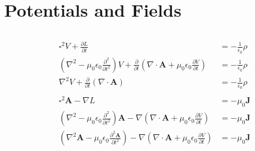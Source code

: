 \documentclass{article}
\renewcommand{\vec}[1]{\boldsymbol{\mathbf{#1}}}
\begin{document}
\section{Potentials and Fields}

\subsection{}

\begin{align*}
  \square^2 V + \frac{\partial L}{\partial t}                                                                                                                                                     & = -\frac{1}{\epsilon_0} \rho \\
  \left( \nabla^2 - \mu_0 \epsilon_0 \frac{\partial^2}{\partial t^2} \right) V + \frac{\partial}{\partial t} \left( \nabla \cdot \vec{A} + \mu_0 \epsilon_0 \frac{\partial V}{\partial t} \right) & = -\frac{1}{\epsilon_0} \rho \\
  \nabla^2 V + \frac{\partial}{\partial t} (\nabla \cdot \vec{A})                                                                                                                                 & = -\frac{1}{\epsilon_0} \rho \\ \\
  \square^2 \vec{A} - \nabla L                                                                                                                                                                    & = -\mu_0 \vec{J}             \\
  \left( \nabla^2 - \mu_0 \epsilon_0 \frac{\partial^2}{\partial t^2} \right) \vec{A} - \nabla \left( \nabla \cdot \vec{A} + \mu_0 \epsilon_0 \frac{\partial V}{\partial t} \right)                & = -\mu_0 \vec{J}             \\
  \left( \nabla^2 \vec{A} - \mu_0 \epsilon_0 \frac{\partial^2 \vec{A}}{\partial t^2} \right) - \nabla \left( \nabla \cdot \vec{A} + \mu_0 \epsilon_0 \frac{\partial V}{\partial t} \right)        & = -\mu_0 \vec{J}
\end{align*}

\subsection{}
\end{document}
